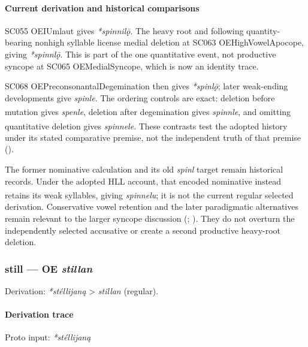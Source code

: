 \documentclass[
  british,
  a4paper,
]{article}
\providecommand{\Pred}[1]{\textsuperscript{\dag}\emph{#1}}
\begin{document}
\paragraph{Current derivation and historical
comparisons}\label{current-derivation-and-historical-comparisons}

SC055 OEIUmlaut gives \emph{*spinnilǭ}. The heavy root and following
quantity-bearing nonhigh syllable license medial deletion at SC063
OEHighVowelApocope, giving \emph{*spinnlǭ}. This is part of the one
quantitative event, not productive syncope at SC065 OEMedialSyncope,
which is now an identity trace.

SC068 OEPreconsonantalDegemination then gives \emph{*spinlǭ}; later
weak-ending developments give \emph{spinle}. The ordering controls are
exact: deletion before mutation gives \Pred{spenle}, deletion after
degemination gives \Pred{spinnle}, and omitting quantitative deletion
gives \Pred{spinnele}. These contrasts test the adopted history under
its stated comparative premise, not the independent truth of that
premise ().

The former nominative calculation and its old \emph{spinl} target remain
historical records. Under the adopted HLL account, that encoded
nominative instead retains its weak syllables, giving \Pred{spinnelu};
it is not the current regular selected derivation. Conservative vowel
retention and the later paradigmatic alternatives remain relevant to the
larger syncope discussion (; ).
They do not overturn the independently selected accusative or create a
second productive heavy-root deletion.

\subsubsection{\texorpdfstring{still --- OE
\emph{stillan}}{still --- OE stillan}}\label{still-oe-stillan}

Derivation: \emph{*stéllijaną} \textgreater{} \emph{stillan} (regular).

\paragraph{Derivation trace}\label{derivation-trace-77}

Proto input: \emph{*stéllijaną}

\begingroup
\setlength{\fboxsep}{6pt}
\end{document}
